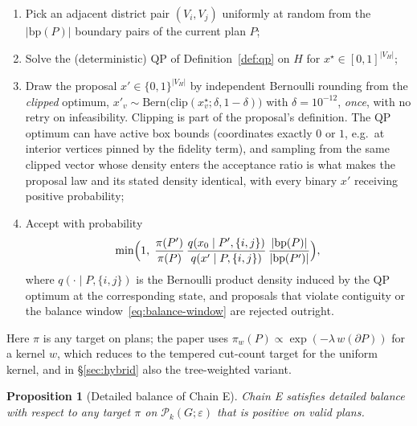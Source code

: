 \documentclass[11pt]{article}
\newtheorem{proposition}{Proposition}[section]
\begin{document}
\begin{enumerate}
  \item Pick an adjacent district pair $(V_i, V_j)$ uniformly at random
    from the $|\mathrm{bp}(P)|$ boundary pairs of the current plan $P$;
  \item Solve the (deterministic) QP of Definition~\ref{def:qp} on
    $H$ for $x^\star \in [0,1]^{|V_H|}$;
  \item Draw the proposal $x' \in \{0,1\}^{|V_H|}$ by independent
    Bernoulli rounding from the \emph{clipped} optimum,
    $x'_v \sim \mathrm{Bern}\bigl(\mathrm{clip}(x^\star_v;
    \delta, 1-\delta)\bigr)$ with $\delta = 10^{-12}$,
    \emph{once}, with no retry on infeasibility. Clipping is part of the
    proposal's definition. The QP optimum can have active box bounds
    (coordinates exactly $0$ or $1$, e.g.\ at interior vertices pinned
    by the fidelity term), and sampling from the same clipped vector
    whose density enters the acceptance ratio is what makes the
    proposal law and its stated density identical, with every binary
    $x'$ receiving positive probability;
  \item Accept with probability
    \begin{equation}\label{eq:qpmh-accept}
      \min\Bigl(1,\;
      \frac{\pi(P')}{\pi(P)}\,
      \frac{q(x_0 \mid P', \{i,j\})}{q(x' \mid P, \{i,j\})}\,
      \frac{|\mathrm{bp}(P)|}{|\mathrm{bp}(P')|}\Bigr),
    \end{equation}
    where $q(\cdot \mid P, \{i,j\})$ is the Bernoulli product density
    induced by the QP optimum at the corresponding state, and proposals
    that violate contiguity or the balance
    window~\eqref{eq:balance-window} are rejected outright.
\end{enumerate}

Here $\pi$ is any target on plans; the paper uses
$\pi_w(P) \propto \exp(-\lambda\, w(\partial P))$ for a kernel $w$,
which reduces to the tempered cut-count target for the uniform
kernel, and in \S\ref{sec:hybrid} also the tree-weighted variant.

\begin{proposition}[Detailed balance of Chain E]\label{prop:qpmh-db}
Chain E satisfies detailed balance with respect to any target $\pi$ on
$\mathcal{P}_k(G; \varepsilon)$ that is positive on valid plans.
\end{proposition}
\end{document}

